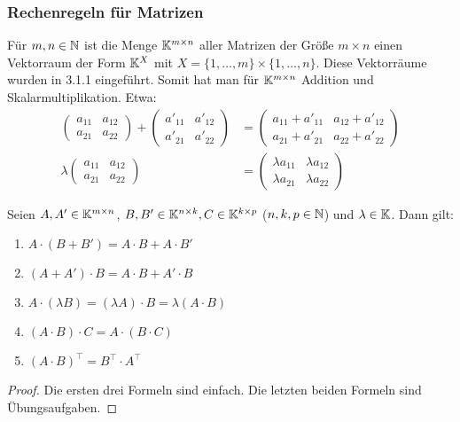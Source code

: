 \subsubsection{Rechenregeln für Matrizen}

Für $ m,n\in\mathbb N $ ist die Menge $ \mathbb K^{m \times n} $ aller Matrizen der Größe $ m \times n $ einen Vektorraum der Form $ \mathbb K^X $ mit $ X = \{ 1,\ldots,m \}\times\{ 1,\ldots,n \} $. Diese Vektorräume wurden in 3.1.1 eingeführt. Somit hat man für $ \mathbb K^{m \times n} $ Addition und Skalarmultiplikation. Etwa:
\begin{align}
	\left( \begin{matrix}
	a_{11} & a_{12} \\ 
	a_{21} & a_{22}
	\end{matrix} \right)
	+
	\left( \begin{matrix}
	a'_{11} & a'_{12} \\ 
	a'_{21} & a'_{22}
	\end{matrix} \right)
	&=
	\left( \begin{matrix}
	a_{11}+a'_{11} & a_{12}+a'_{12} \\ 
	a_{21}+a'_{21} & a_{22}+a'_{22}
	\end{matrix} \right)\\
	\lambda
	\left( \begin{matrix}
	a_{11} & a_{12} \\ 
	a_{21} & a_{22}
	\end{matrix} \right)
	&=
	\left( \begin{matrix}
	\lambda a_{11} & \lambda a_{12} \\ 
	\lambda a_{21} & \lambda a_{22}
	\end{matrix} \right)
\end{align}

\begin{thm}
	 Seien $ A,A'\in\mathbb K^{m \times n} $, $ B,B'\in\mathbb K^{n \times k}, C \in \mathbb K^{k \times p} $ ($n,k,p \in \mathbb N$) und $ \lambda\in\mathbb K $. Dann gilt:
	\begin{enumerate}[label=\normalfont(\roman*)]
		\item $ A \cdot ( B + B') = A \cdot B + A \cdot B' $
		\item $ (A + A') \cdot B = A \cdot B + A' \cdot B $
		\item $ A \cdot (\lambda B) = (\lambda A) \cdot B = \lambda (A \cdot B) $
		\item $ (A \cdot B) \cdot C = A \cdot (B \cdot C) $
		\item $ (A \cdot B)^\top = B^\top \cdot A^\top $
	\end{enumerate}
\end{thm}
\begin{proof}
	Die ersten drei Formeln sind einfach. Die letzten beiden Formeln sind Übungsaufgaben.
\end{proof}

